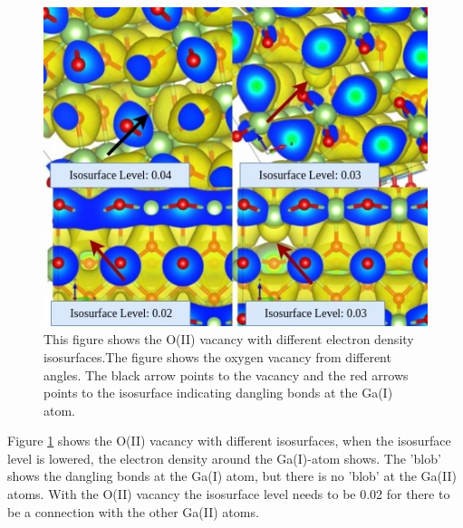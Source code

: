 \begin{figure}[H]
\includegraphics[width=\linewidth]{../fig/isosurfaces/O_II/isosurface}\caption{This figure shows the O(II) vacancy with different electron density isosurfaces.The figure shows the oxygen vacancy from different angles. The black arrow points to the vacancy and the red arrows points to the isosurface indicating dangling bonds at the Ga(I) atom.}\label{fig:isosurface_O_II}
\end{figure}

Figure \ref{fig:isosurface_O_II} shows the O(II) vacancy with different isosurfaces, when the isosurface level is lowered, the electron density around the Ga(I)-atom shows. The 'blob' shows the dangling bonds at the Ga(I) atom, but there is no 'blob' at the Ga(II) atoms. With the O(II) vacancy the isosurface level needs to be 0.02 for there to be a connection with the other Ga(II) atoms.

